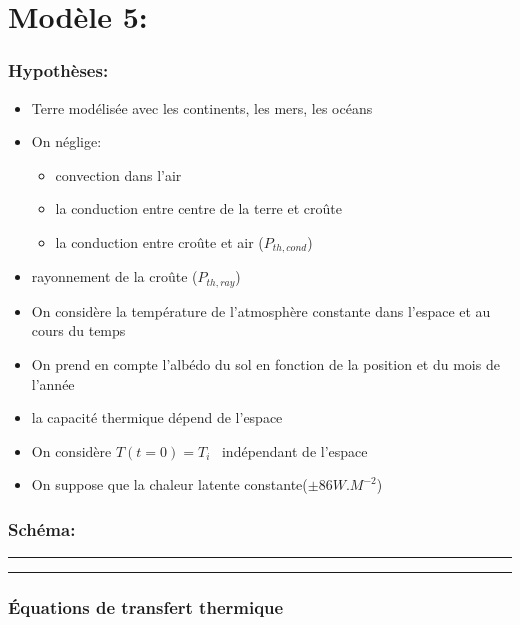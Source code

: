 \documentclass[a4paper,12pt]{article}
\begin{document}
\section*{Modèle 5: }
\subsubsection*{Hypothèses:}
\begin{itemize}
    \item Terre modélisée avec les continents, les mers, les océans 
    \item  On néglige: 
    \begin{itemize}
        \item convection dans l'air
        \item la conduction entre centre de la terre et croûte
        \item la conduction entre croûte et air (\(P_{th,cond}\))
    \end{itemize} 
    \item  rayonnement de la croûte (\(P_{th,ray}\))
    \item On considère la température de l'atmosphère constante dans l'espace et  au cours du temps 
    \item On prend en compte l'albédo du sol en fonction de la position et du mois de l'année 
    \item la capacité thermique dépend de l'espace 
    \item On considère $T(t=0) = T_i$ \  indépendant de l'espace  
    \item On suppose que la chaleur latente constante($\pm 86 W.M^{-2}$)
    
    
\end{itemize}

\subsubsection*{Schéma:} 

\noindent\textcolor{gray}{\rule{\linewidth}{0.4pt}}

  
\begin{center}
  
\end{center}
\noindent\textcolor{gray}{\rule{\linewidth}{0.4pt}}

\subsubsection*{Équations de transfert thermique}
\end{document}
